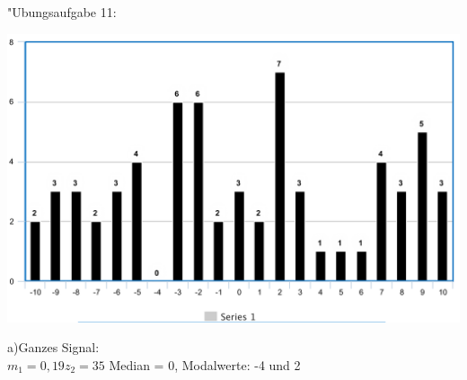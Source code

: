 

	"Ubungsaufgabe 11:\newline
	
	\includegraphics[scale=0.4]{A11_Histo.png}
	
	a)Ganzes Signal:\\
	$m_1 = 0,19		z_2 = 35$ \hspace{1cm}
	Median = 0,	Modalwerte: -4 und 2
	
